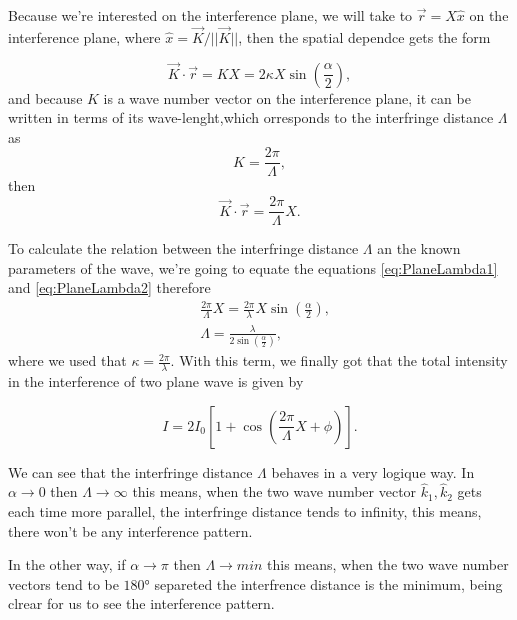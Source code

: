         Because we're interested on the interference plane, we will take to $\vec{r} = X\hat{x}$ on the interference plane, where $\hat{x} = \vec{K}/ ||\vec{K} ||$, then the spatial dependce gets the form

        \begin{equation}\label{eq:PlaneLambda1}
            \vec{K}\cdot \vec{r} = KX = 2\kappa X \sin\left(\frac{\alpha}{2}\right),
        \end{equation}
        and because $K$ is a wave number vector on the interference plane, it can be written in terms of its wave-lenght,which orresponds to the interfringe distance $\Lambda$ as
        \begin{equation}
            K = \frac{2\pi}{\Lambda},
        \end{equation}
        then 
        \begin{equation}\label{eq:PlaneLambda2}
            \vec{K}\cdot \vec{r} = \frac{2\pi}{\Lambda}X.
        \end{equation}

        To calculate the relation between the interfringe distance $\Lambda$ an the known parameters of the wave, we're going to equate the equations \ref{eq:PlaneLambda1} and \ref{eq:PlaneLambda2} therefore
        \begin{align}
            & \frac{2\pi}{\Lambda}X = \frac{2\pi}{\lambda}X\sin\left(\frac{\alpha}{2}\right),\\
            & \Lambda = \frac{\lambda}{2\sin\left(\frac{\alpha}{2}\right)},
        \end{align}
        where we used that $\kappa = \frac{2\pi}{\lambda}$. With this term, we finally got that the total intensity in the interference of two plane wave is given by

        \begin{equation}
            I = 2I_0 \left[1 + \cos\left(\frac{2\pi}{\Lambda}X + \phi\right)\right].
        \end{equation}

        We can see that the interfringe distance $\Lambda$ behaves in a very logique way. In $\alpha \to 0$ then $\Lambda \to \infty$ this means, when the two wave number vector $\hat{k}_1,\hat{k}_2$ gets each time more parallel, the interfringe distance tends to infinity, this means, there won't be any interference pattern. 

        In the other way, if $\alpha \to \pi$ then $\Lambda \to min$ this means, when the two wave number vectors tend to be $180$° separeted the interfrence distance is the minimum, being clrear for us to see the interference pattern. 


